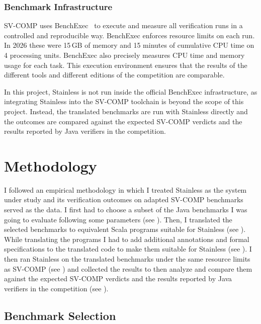\documentclass[11pt,titlepage,openright]{book}
\begin{document}
\subsection{Benchmark Infrastructure}
\label{sec:svcomp-infra}
 
SV-COMP uses BenchExec~\cite{BenchExec} to execute and measure all
verification runs in a controlled and reproducible way.
BenchExec enforces resource limits on each run. In 2026 these were
15\,GB of memory and 15 minutes of cumulative CPU time on 4 processing
units. BenchExec also precisely measures CPU time and memory usage for each task.
This execution environment ensures that the results of the different tools
and different editions of the competition are comparable.

In this project, Stainless is not run inside the official BenchExec
infrastructure, as integrating Stainless into the SV-COMP toolchain
is beyond the scope of this project.
Instead, the translated benchmarks are run with Stainless directly and
the outcomes are compared against the expected SV-COMP verdicts and the
results reported by Java verifiers in the competition.

\chapter{Methodology}
\label{cha:methodology}

I followed an empirical methodology in
which I treated Stainless as the system under study and its verification
outcomes on adapted SV-COMP benchmarks served as the data. I first
had to choose a subset of the Java benchmarks I was going to evaluate 
following some parameters (see ).
Then, I translated the selected benchmarks to equivalent Scala programs 
suitable for Stainless (see ).
While translating the programs I had to add additional annotations and 
formal specifications to the translated code to make them 
suitable for Stainless (see ).
I then ran Stainless on the translated benchmarks under the same 
resource limits as SV-COMP (see ) and collected the 
results to then analyze and compare them against the expected
SV-COMP verdicts and the results reported by Java verifiers 
in the competition (see ). 
 
\section{Benchmark Selection}
\label{sec:benchmark-selection}
 
\end{document}
